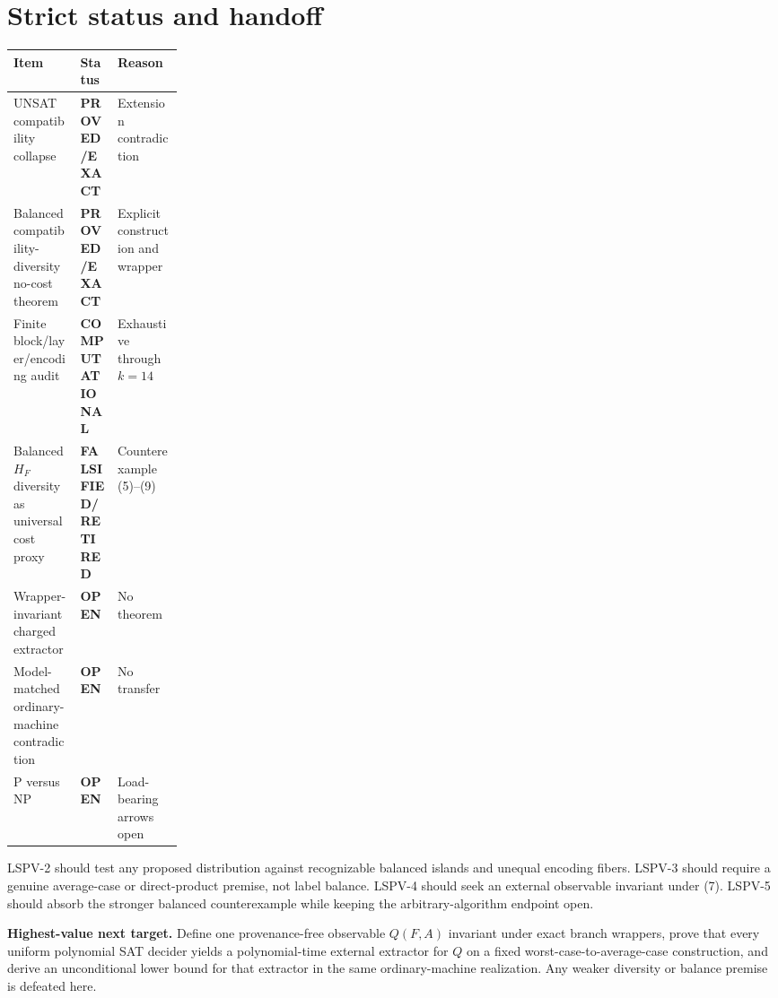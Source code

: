 \documentclass[11pt]{article}
\newcommand{\EXACT}{\textbf{PROVED/EXACT}}
\newcommand{\COMP}{\textbf{COMPUTATIONAL}}
\newcommand{\OPEN}{\textbf{OPEN}}
\newcommand{\RET}{\textbf{FALSIFIED/RETIRED}}
\begin{document}
\section{Strict status and handoff}
\begin{center}
\begin{tabularx}{0.98\linewidth}{Xp{0.22\linewidth}X}
\toprule Item & Status & Reason\\ \midrule
UNSAT compatibility collapse & \EXACT & Extension contradiction\\
Balanced compatibility-diversity no-cost theorem & \EXACT & Explicit construction and wrapper\\
Finite block/layer/encoding audit & \COMP & Exhaustive through \(k=14\)\\
Balanced \(H_F\) diversity as universal cost proxy & \RET & Counterexample (5)--(9)\\
Wrapper-invariant charged extractor & \OPEN & No theorem\\
Model-matched ordinary-machine contradiction & \OPEN & No transfer\\
P versus NP & \OPEN & Load-bearing arrows open\\ \bottomrule
\end{tabularx}
\end{center}

LSPV-2 should test any proposed distribution against recognizable balanced
islands and unequal encoding fibers.  LSPV-3 should require a genuine
average-case or direct-product premise, not label balance.  LSPV-4 should seek
an external observable invariant under (7).  LSPV-5 should absorb the stronger
balanced counterexample while keeping the arbitrary-algorithm endpoint open.

\textbf{Highest-value next target.}  Define one provenance-free observable
\(Q(F,A)\) invariant under exact branch wrappers, prove that every uniform
polynomial SAT decider yields a polynomial-time external extractor for \(Q\)
on a fixed worst-case-to-average-case construction, and derive an
unconditional lower bound for that extractor in the same ordinary-machine
realization.  Any weaker diversity or balance premise is defeated here.
\end{document}
